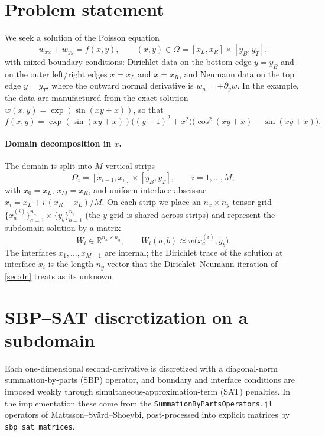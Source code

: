 \documentclass[hidelinks,onefignum,onetabnum]{siamart250211}
\newcommand{\R}{\mathbb{R}}
\begin{document}
\section{Problem statement}
\label{sec:problem}
We seek a solution of the Poisson equation
\begin{equation}
\label{eq:poisson}
w_{xx} + w_{yy} = f(x,y), \qquad (x,y) \in \Omega = [x_L,x_R]\times[y_B,y_T],
\end{equation}
with mixed boundary conditions: Dirichlet data on the bottom edge $y=y_B$ and on
the outer left/right edges $x=x_L$ and $x=x_R$, and Neumann data on the top edge
$y=y_T$, where the outward normal derivative is $w_n = +\partial_y w$.  In the
example, the data are manufactured from the exact solution
$w(x,y) = \exp(\sin(xy+x))$, so that
\[
f(x,y) = \exp(\sin(xy+x))\bigl((y+1)^2 + x^2\bigr)
         \bigl(\cos^2(xy+x) - \sin(xy+x)\bigr).
\]

\paragraph{Domain decomposition in $x$.}  The domain is split into $M$ vertical
strips
\[
\Omega_i = [x_{i-1},x_i]\times[y_B,y_T], \qquad i=1,\dots,M,
\]
with $x_0 = x_L$, $x_M = x_R$, and uniform interface abscissae
$x_i = x_L + i\,(x_R-x_L)/M$.  On each strip we place an $n_x\times n_y$ tensor
grid $\{x^{(i)}_a\}_{a=1}^{n_x}\times\{y_b\}_{b=1}^{n_y}$ (the $y$-grid is shared
across strips) and represent the subdomain solution by a matrix
\[
W_i \in \R^{n_x\times n_y}, \qquad W_i(a,b) \approx w\bigl(x^{(i)}_a, y_b\bigr).
\]
The interfaces $x_1,\dots,x_{M-1}$ are internal; the Dirichlet trace of the
solution at interface $x_i$ is the length-$n_y$ vector that the
Dirichlet--Neumann iteration of \cref{sec:dn} treats as its unknown.

\section{SBP--SAT discretization on a subdomain}
\label{sec:sbpsat}
Each one-dimensional second-derivative is discretized with a diagonal-norm
summation-by-parts (SBP) operator, and boundary and interface conditions are
imposed weakly through simultaneous-approximation-term (SAT) penalties.  In the
implementation these come from the {\tt SummationByPartsOperators.jl} operators
of Mattsson--Sv\"ard--Shoeybi, post-processed into explicit matrices by
{\tt sbp\_sat\_matrices}.
\end{document}
